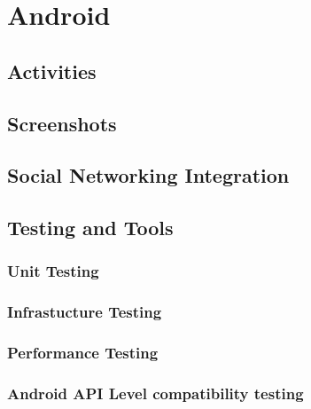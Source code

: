 \section{Android}
	\subsection{Activities}
	\subsection{Screenshots}
	\subsection{Social Networking Integration}
	\subsection{Testing and Tools}
		\subsubsection{Unit Testing}
		\subsubsection{Infrastucture Testing}
		\subsubsection{Performance Testing}
		\subsubsection{Android API Level compatibility testing}

